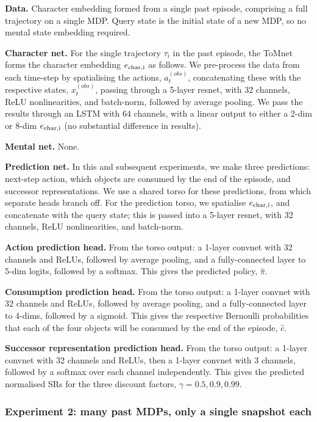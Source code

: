 \documentclass{article}
\begin{document}
{\bf Data.} Character embedding formed from a single past episode, comprising a full trajectory on a single MDP. Query state is the initial state of a new MDP, so no mental state embedding required.

{\bf Character net.} For the single trajectory $\tau_{i}$ in the past episode, the ToMnet forms the character embedding $e_{\mathrm{char,i}}$ as follows. We pre-process the data from each time-step by spatialising the actions, $a_t^{(obs)}$, concatenating these with the respective states, $x_t^{(obs)}$, passing through a 5-layer resnet, with 32 channels, ReLU nonlinearities, and batch-norm, followed by average pooling. We pass the results through an LSTM with 64 channels, with a linear output to either a 2-dim or 8-dim $e_{\mathrm{char,i}}$ (no substantial difference in results).

{\bf Mental net.} None.

{\bf Prediction net.} In this and subsequent experiments, we make three predictions: next-step action, which objects are consumed by the end of the episode, and successor representations. We use a shared torso for these predictions, from which separate heads branch off. For the prediction torso, we spatialise $e_{\mathrm{char,i}}$, and concatenate with the query state; this is passed into a 5-layer resnet, with 32 channels, ReLU nonlinearities, and batch-norm.

{\bf Action prediction head.} From the torso output: a 1-layer convnet with 32 channels and ReLUs, followed by average pooling, and a fully-connected layer to 5-dim logits, followed by a softmax. This gives the predicted policy, $\hat{\pi}$.

{\bf Consumption prediction head.} From the torso output: a 1-layer convnet with 32 channels and ReLUs, followed by average pooling, and a fully-connected layer to 4-dims, followed by a sigmoid. This gives the respective Bernoulli probabilities that each of the four objects will be consumed by the end of the episode, $\hat{c}$.

{\bf Successor representation prediction head.} From the torso output: a 1-layer convnet with 32 channels and ReLUs, then a 1-layer convnet with 3 channels, followed by a softmax over each channel independently. This gives the predicted normalised SRs for the three discount factors, $\gamma = 0.5, 0.9, 0.99$.

\subsubsection{Experiment 2: many past MDPs, only a single snapshot each}
\end{document}
